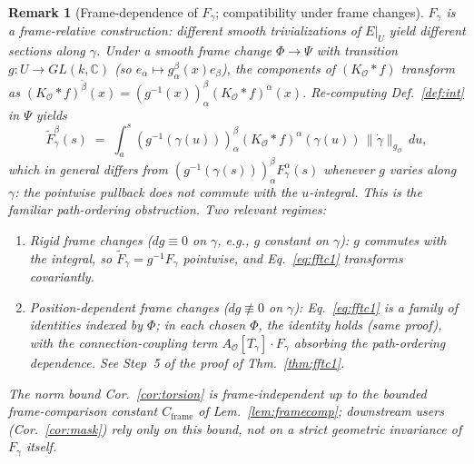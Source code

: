 \documentclass[11pt]{article}
\newtheorem{remark}{Remark}
\newcommand{\Obs}{\mathcal{O}}
\newcommand{\AO}{A_{\Obs}}
\newcommand{\gO}{g_{\Obs}}
\newcommand{\KO}{K_{\Obs}}
\newcommand{\EE}{E}
\newcommand{\Cframe}{C_{\mathrm{frame}}}
\begin{document}
\begin{remark}[Frame-dependence of $F_\gamma$; compatibility under
frame changes]
\label{rem:gauge-F}
$F_\gamma$ is a \emph{frame-relative} construction: different smooth
trivializations of $\EE|_U$ yield different sections along $\gamma$.
Under a smooth frame change
$\Phi \to \Psi$ with transition $g: U \to GL(k, \mathbb{C})$
(so $e_\alpha \mapsto g^\beta_\alpha(x) e_\beta$), the components
of $(\KO * f)$ transform as
$(\KO * f)^{\tilde\beta}(x) = (g^{-1}(x))^\beta_\alpha (\KO * f)^\alpha(x)$.
Re-computing Def.~\ref{def:int} in $\Psi$ yields
\[
\tilde F_\gamma^\beta(s) \;=\; \int_a^s (g^{-1}(\gamma(u)))^\beta_\alpha (\KO * f)^\alpha(\gamma(u))\, \|\dot\gamma\|_{\gO}\, du,
\]
which in general \emph{differs from} $(g^{-1}(\gamma(s)))^\beta_\alpha F_\gamma^\alpha(s)$
whenever $g$ varies along $\gamma$: the pointwise pullback does not
commute with the $u$-integral. This is the familiar path-ordering
obstruction. Two relevant regimes:
\begin{enumerate}[label=(\alph*)]
\item \emph{Rigid frame changes} ($dg \equiv 0$ on $\gamma$, e.g., $g$
constant on $\gamma$): $g$ commutes with the integral, so
$\tilde F_\gamma = g^{-1} F_\gamma$ pointwise, and
Eq.~\eqref{eq:fftc1} transforms covariantly.
\item \emph{Position-dependent frame changes} ($dg \not\equiv 0$ on
$\gamma$): Eq.~\eqref{eq:fftc1} is a family of identities indexed by
$\Phi$; in each chosen $\Phi$, the identity holds (same proof), with
the connection-coupling term $\AO[T_\gamma] \cdot F_\gamma$ absorbing
the path-ordering dependence. See Step~5 of the proof of
Thm.~\ref{thm:fftc1}.
\end{enumerate}
The \emph{norm bound} Cor.~\ref{cor:torsion} is frame-independent up
to the bounded frame-comparison constant $\Cframe$ of
Lem.~\ref{lem:framecomp}; downstream users (Cor.~\ref{cor:mask}) rely
only on this bound, not on a strict geometric invariance of
$F_\gamma$ itself.
\end{remark}
\end{document}
